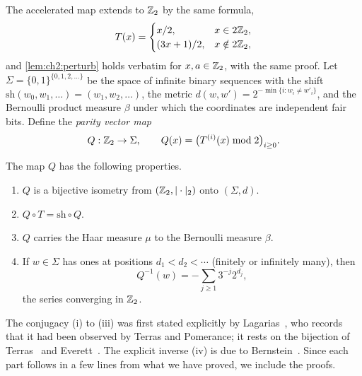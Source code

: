 The accelerated map extends to $\mathbb{Z}_2$ by the same formula,
\[
  T(x)=\begin{cases}x/2,& x\in2\mathbb{Z}_2,\\ (3x+1)/2,& x\notin2\mathbb{Z}_2,\end{cases}
\]
and \cref{lem:ch2:perturb} holds verbatim for $x,a\in\mathbb{Z}_2$, with the same
proof. Let $\Sigma=\{0,1\}^{\{0,1,2,\ldots\}}$ be the space of infinite binary
sequences with the shift $\mathrm{sh}(w_0,w_1,\ldots)=(w_1,w_2,\ldots)$, the metric
$d(w,w')=2^{-\min\{i:w_i\neq w'_i\}}$, and the Bernoulli product measure
$\beta$ under which the coordinates are independent fair bits. Define the
\emph{parity vector map}
\[
  Q:\mathbb{Z}_2\to\Sigma,\qquad Q(x)=\bigl(T^{(i)}(x)\bmod2\bigr)_{i\geq0}.
\]

\begin{theorem}\label{thm:ch2:conj}
The map $Q$ has the following properties.
\begin{enumerate}[label=(\roman*),leftmargin=2em]
\item $Q$ is a bijective isometry from $(\mathbb{Z}_2,|\cdot|_2)$ onto $(\Sigma,d)$.
\item $Q\circ T=\mathrm{sh}\circ Q$.
\item $Q$ carries the Haar measure $\mu$ to the Bernoulli measure $\beta$.
\item If $w\in\Sigma$ has ones at positions $d_1<d_2<\cdots$ (finitely or
  infinitely many), then
  \[
    Q^{-1}(w)=-\sum_{j\geq1}3^{-j}2^{d_j},
  \]
  the series converging in $\mathbb{Z}_2$.
\end{enumerate}
\end{theorem}

The conjugacy (i) to (iii) was first stated explicitly by Lagarias~\cite[Theorem~L]{lagarias1985}, who records that it had been observed by Terras and Pomerance; it rests on the bijection of Terras~\cite{terras1976} and Everett~\cite{everett1977}.
The explicit inverse (iv) is due to
Bernstein~\cite{bernstein1994}. Since each part follows in a few lines from
what we have proved, we include the proofs.

